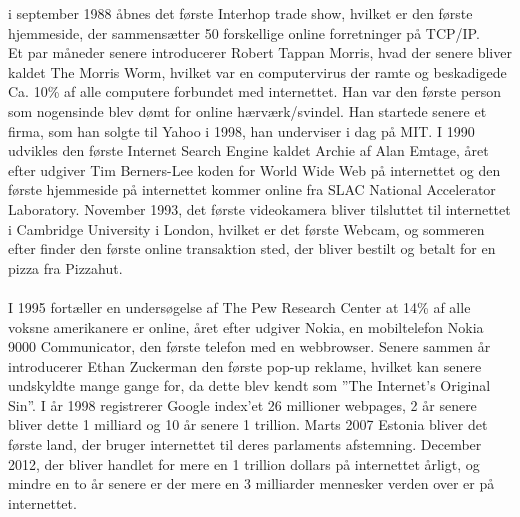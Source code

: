     i september 1988 åbnes det første Interhop trade show, hvilket er den første hjemmeside, der sammensætter 50 forskellige online forretninger på TCP/IP.\\
    Et par måneder senere introducerer Robert Tappan Morris, hvad der senere bliver kaldet The Morris Worm, hvilket var en computervirus der ramte og beskadigede Ca. 10\% af alle computere forbundet med internettet. Han var den første person som nogensinde blev dømt for online hærværk/svindel. Han startede senere et firma, som han solgte til Yahoo i 1998, han underviser i dag på MIT. I 1990 udvikles den første Internet Search Engine kaldet Archie af Alan Emtage, året efter udgiver Tim Berners-Lee koden for World Wide Web på internettet og den første hjemmeside på internettet kommer online fra SLAC National Accelerator Laboratory. November 1993, det første videokamera bliver tilsluttet til internettet i Cambridge University i London, hvilket er det første Webcam, og sommeren efter finder den første online transaktion sted, der bliver bestilt og betalt for en pizza fra Pizzahut.\\\\
    I 1995 fortæller en undersøgelse af The Pew Research Center at 14\% af alle voksne amerikanere er online, året efter udgiver Nokia, en mobiltelefon Nokia 9000 Communicator, den første telefon med en webbrowser. Senere sammen år introducerer Ethan Zuckerman den første pop-up reklame, hvilket kan senere undskyldte mange gange for, da dette blev kendt som ”The Internet’s Original Sin”. I år 1998 registrerer Google index’et 26 millioner webpages, 2 år senere bliver dette 1 milliard og 10 år senere 1 trillion. Marts 2007 Estonia bliver det første land, der bruger internettet til deres parlaments afstemning. December 2012, der bliver handlet for mere en 1 trillion dollars på internettet årligt, og mindre en to år senere er der mere en 3 milliarder mennesker verden over er på internettet.\autocite{gilpress2015}\\
